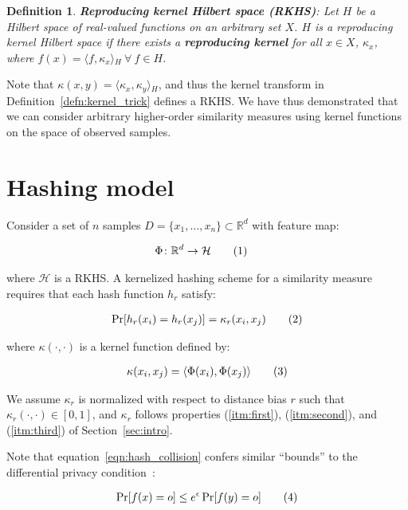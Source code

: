 \documentclass[a4paper]{article}
\newcommand\numberthis{\addtocounter{equation}{1}\tag{\theequation}}
\newcommand{\innerproduct}[2]{\langle{}#1,#2\rangle{}}
\newtheorem{definition}{Definition}
\begin{document}
\begin{definition}\label{defn:rkhs}
    \textbf{Reproducing kernel Hilbert space (RKHS)}:
    Let $H$ be a Hilbert space of real-valued functions on an arbitrary set $X$.
    $H$ is a reproducing kernel Hilbert space if there exists a \textbf{reproducing kernel} for all $x \in X$, $\kappa_x$, where $f(x) = \innerproduct{f}{\kappa_x}_H~\forall~f \in H$.
\end{definition}

Note that $\kappa(x,y) = \innerproduct{\kappa_x}{\kappa_y}_H$, and thus the kernel transform in Definition~\ref{defn:kernel_trick} defines a RKHS.
We have thus demonstrated that we can consider arbitrary higher-order similarity measures using kernel functions on the space of observed samples.

\section{Hashing model}
\label{sec:hashing}

Consider a set of $n$ samples $D = \{x_1,\ldots,x_n\} \subset \mathbb{R}^d$ with feature map:

\begin{align*}
    \Phi \colon \mathbb{R}^d &\to \mathcal{H} \numberthis
\end{align*}

where $\mathcal{H}$ is a RKHS\@.
A kernelized hashing scheme for a similarity measure requires that each hash function $h_r$ satisfy:

\begin{align*}
    \Pr[h_r(x_i) = h_r(x_j)] = \kappa_r(x_i, x_j) \numberthis
    \label{eqn:hash_collision}
\end{align*}

where $\kappa(\cdot,\cdot)$ is a kernel function defined by:

\begin{align*}
    \kappa(x_i,x_j) = \innerproduct{\Phi(x_i)}{\Phi(x_j)} \numberthis
\end{align*}

We assume $\kappa_r$ is normalized with respect to distance bias $r$ such that $\kappa_r(\cdot,\cdot) \in [0,1]$, and $\kappa_r$ follows properties (\ref{itm:first}), (\ref{itm:second}), and (\ref{itm:third}) of Section~\ref{sec:intro}.

Note that equation~\ref{eqn:hash_collision} confers similar ``bounds'' to the differential privacy condition~\cite{dwork2006}:

\begin{align*}
    \Pr[f(x) = o] \le e^{\epsilon} \Pr[f(y) = o] \numberthis
    \label{eqn:differential_privacy}
\end{align*}
\end{document}
